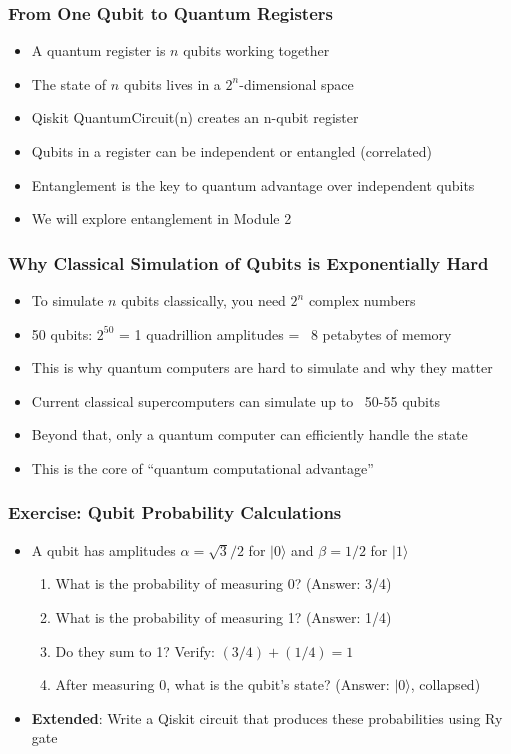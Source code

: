 \begin{frame}[fragile]\frametitle{From One Qubit to Quantum Registers}
\begin{itemize}
\item A quantum register is $n$ qubits working together
\item The state of $n$ qubits lives in a $2^n$-dimensional space
\item Qiskit QuantumCircuit(n) creates an n-qubit register
\item Qubits in a register can be independent or entangled (correlated)
\item Entanglement is the key to quantum advantage over independent qubits
\item We will explore entanglement in Module 2
\end{itemize}
\end{frame}

\begin{frame}[fragile]\frametitle{Why Classical Simulation of Qubits is Exponentially Hard}
\begin{itemize}
\item To simulate $n$ qubits classically, you need $2^n$ complex numbers
\item 50 qubits: $2^{50}$ = 1 quadrillion amplitudes = ~8 petabytes of memory
\item This is why quantum computers are hard to simulate and why they matter
\item Current classical supercomputers can simulate up to ~50-55 qubits
\item Beyond that, only a quantum computer can efficiently handle the state
\item This is the core of ``quantum computational advantage''
\end{itemize}
\end{frame}

\begin{frame}[fragile]\frametitle{Exercise: Qubit Probability Calculations}
\begin{itemize}
\item A qubit has amplitudes $\alpha = \sqrt{3}/2$ for $|0\rangle$ and $\beta = 1/2$ for $|1\rangle$
\begin{enumerate}
  \item What is the probability of measuring 0? (Answer: 3/4)
  \item What is the probability of measuring 1? (Answer: 1/4)
  \item Do they sum to 1? Verify: $(3/4) + (1/4) = 1$
  \item After measuring 0, what is the qubit's state? (Answer: $|0\rangle$, collapsed)
\end{enumerate}
\item \textbf{Extended}: Write a Qiskit circuit that produces these probabilities using Ry gate
\end{itemize}
\end{frame}

